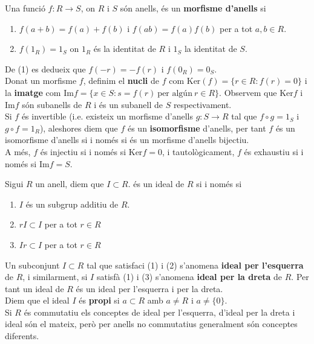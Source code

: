 \begin{definition} Una funció $f:R\rightarrow S$, on $R$ i $S$ són anells, és un \textbf{morfisme d'anells} si 
\begin{enumerate}[(1)]
\item $f(a+b)=f(a)+f(b)$ i $f(ab)=f(a)f(b)$ per a tot $a,b\in R$.
\item $f(1_R)=1_S$ on $1_R$ és la identitat de $R$ i $1_S$ la identitat de $S$.
\end{enumerate}
\indent De (1) es dedueix que $f(-r)=-f(r)$ i $f(0_R)=0_S$.
\\ 
\indent Donat un morfisme $f$, definim el \textbf{nucli} de $f$ com $\text{Ker}(f)=\{ r\in R : f(r)=0 \}$ i la \textbf{imatge} com $\text{Im} f = \{ x\in S : s=f(r) \ \text{per algún} \ r\in R \}$. Observem que $\text{Ker} f$ i $\text{Im}f$ són subanells de $R$ i  és un subanell de $S$ respectivament.
\\ 
\indent Si $f$ és invertible (i.e. existeix un morfisme d'anells $g:S\rightarrow R$ tal que $f \circ g =1_S$ i $g \circ f=1_R$), aleshores diem que $f$ és un \textbf{isomorfisme} d'anells, per tant $f$ és un isomorfisme d'anells si i només si és un morfisme d'anells bijectiu.
\\
A més, $f$ és injectiu si i només si $\text{Ker} f = 0$, i tautològicament, $f$ és exhaustiu si i només si $\text{Im} f=S$.
\end{definition}

\begin{definition}
Sigui $R$ un anell, diem que $I\subset R$. és un ideal de $R$ si i només si 
\begin{enumerate}[(1)]
\item $I$ és un subgrup additiu de $R$.
\item $rI\subset I$ per a tot $r\in R$
\item $Ir\subset I$ per a tot $r\in R$
\end{enumerate}
\hspace{.25cm}Un subconjunt $I\subset R$ tal que satisfaci (1) i (2) s'anomena \textbf{ideal per l'esquerra} de $R$, i similarment, si $I$ satisfà (1) i (3) s'anomena \textbf{ideal per la dreta} de $R$. Per tant un ideal de $R$ és un ideal per l'esquerra i per la dreta. \\
Diem que el ideal $I$ és \textbf{propi} si $a\subset R$ amb $a\neq R$ i $a \neq \{ 0 \}$.
\\
\hspace{.25cm}Si $R$ és commutatiu els conceptes de ideal per l'esquerra, d'ideal per la dreta i ideal són el mateix, però per anells no commutatius generalment són conceptes diferents.
\end{definition}

